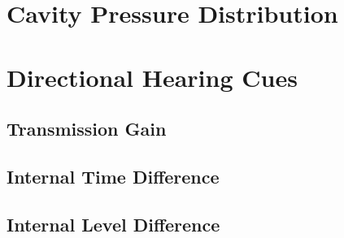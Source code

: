 
\section{Cavity Pressure Distribution}\label{pressuredistchapter}

\section{Directional Hearing Cues}\label{hearingcueschapter}

\subsection{Transmission Gain}

\subsection{Internal Time Difference}

\subsection{Internal Level Difference}